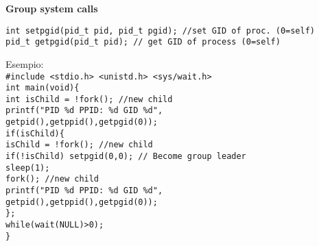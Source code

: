 \begin{flushleft}
  \begin{flushleft}
    \textbf{Group system calls}\\
    \begin{flushleft}
      \texttt{int setpgid(pid\_t pid, pid\_t pgid); //set GID of proc. (0=self)\\
              pid\_t getpgid(pid\_t pid); // get GID of process (0=self) }      
    \end{flushleft}
    \begin{flushleft}
      Esempio: \\
      \texttt{\#include <stdio.h> <unistd.h> <sys/wait.h> \\
      int main(void)\{ \\
      \halftab int isChild = !fork(); //new child\\
      \halftab printf("PID \%d PPID: \%d GID \%d\n", \\
                      \tab \tab getpid(),getppid(),getpgid(0));\\
      \halftab if(isChild)\{ \\
      \halftab isChild = !fork(); //new child\\
      \halftab if(!isChild) setpgid(0,0); // Become group leader\\
      \tab sleep(1);\\
      \tab fork(); //new child\\
      \tab printf("PID \%d PPID: \%d GID \%d\n",\\
                  \halftab \tab \tab getpid(),getppid(),getpgid(0));\\
      \halftab \}; \\ 
      \halftab while(wait(NULL)>0);\\
      \}}
    \end{flushleft}

\end{flushleft}
\end{flushleft}

